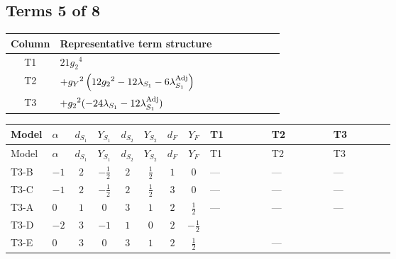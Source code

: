 \documentclass[8pt]{article}
\begin{document}
\begin{landscape}
\subsection*{Terms 5 of 8}
\begin{center}
\begin{tabular}{@{}c >{\raggedright\arraybackslash}p{0.82\linewidth}@{}}
\toprule
Column & Representative term structure \\
\midrule
T1 & \(\displaystyle 21 {g_2}^4\) \\
\midrule
T2 & \(\displaystyle +{g_Y}^2 \left(12 {g_2}^2-12 {\lambda_{S_1}}-6 {\lambda_{S_1}^{\rm Adj}}\right)\) \\
\midrule
T3 & \(\displaystyle +{g_2}^2 (-24 {\lambda_{S_1}}-12 {\lambda_{S_1}^{\rm Adj}})\) \\
\midrule
\bottomrule
\end{tabular}
\end{center}
\smallskip
\tiny
\begin{longtable}{@{}llcccccc >{\raggedright\arraybackslash}p{0.21\linewidth} >{\raggedright\arraybackslash}p{0.21\linewidth} >{\raggedright\arraybackslash}p{0.21\linewidth}@{}}
\toprule
Model & $\alpha$ & $d_{S_1}$ & $Y_{S_1}$ & $d_{S_2}$ & $Y_{S_2}$ & $d_F$ & $Y_F$ & T1 & T2 & T3 \\
\midrule
\endfirsthead
\toprule
Model & $\alpha$ & $d_{S_1}$ & $Y_{S_1}$ & $d_{S_2}$ & $Y_{S_2}$ & $d_F$ & $Y_F$ & T1 & T2 & T3 \\
\midrule
\endhead
T3-B & $-1$ & $2$ & $-\frac{1}{2}$ & $2$ & $\frac{1}{2}$ & $1$ & $0$ & --- & --- & --- \\
\midrule
T3-C & $-1$ & $2$ & $-\frac{1}{2}$ & $2$ & $\frac{1}{2}$ & $3$ & $0$ & --- & --- & --- \\
\midrule
T3-A & $0$ & $1$ & $0$ & $3$ & $1$ & $2$ & $\frac{1}{2}$ & --- & --- & --- \\
\midrule
T3-D & $-2$ & $3$ & $-1$ & $1$ & $0$ & $2$ & $-\frac{1}{2}$ & \scriptsize\adjustbox{max width=\linewidth}{$\begin{gathered} 21 {g_2}^4\end{gathered}$} & \scriptsize\adjustbox{max width=\linewidth}{$\begin{gathered} +{g_Y}^2 \left(12 {g_2}^2-12 {\lambda_{S_1}}-6 {\lambda_{S_1}^{\rm Adj}}\right)\end{gathered}$} & \scriptsize\adjustbox{max width=\linewidth}{$\begin{gathered} +{g_2}^2 (-24 {\lambda_{S_1}}-12 {\lambda_{S_1}^{\rm Adj}})\end{gathered}$} \\
\midrule
T3-E & $0$ & $3$ & $0$ & $3$ & $1$ & $2$ & $\frac{1}{2}$ & \scriptsize\adjustbox{max width=\linewidth}{$\begin{gathered} 21 {g_2}^4\end{gathered}$} & --- & \scriptsize\adjustbox{max width=\linewidth}{$\begin{gathered} +{g_2}^2 (-24 {\lambda_{S_1}}-12 {\lambda_{S_1}^{\rm Adj}})\end{gathered}$} \\
\midrule
\bottomrule
\end{longtable}
\clearpage

\end{landscape}
\end{document}
